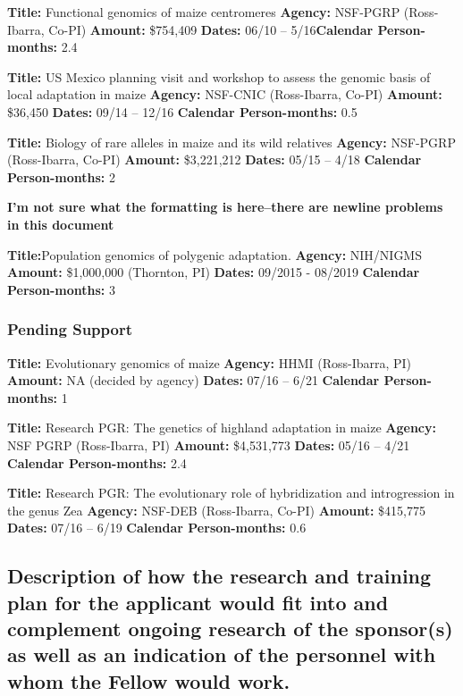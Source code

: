 \noindent\textbf{Title:} Functional genomics of maize centromeres 
\textbf{Agency:} NSF-PGRP (Ross-Ibarra, Co-PI)
\textbf{Amount:} \$754,409
\textbf{Dates:} 06/10 – 5/16\textbf{Calendar Person-months:} 2.4

\noindent\textbf{Title:} US Mexico planning visit and workshop to assess the genomic basis of local adaptation in maize 
\textbf{Agency:} NSF-CNIC (Ross-Ibarra, Co-PI)
\textbf{Amount:} \$36,450
\textbf{Dates:} 09/14 – 12/16
\textbf{Calendar Person-months:} 0.5

\textbf{Title:} Biology of rare alleles in maize and its wild relatives 
\textbf{Agency:} NSF-PGRP (Ross-Ibarra, Co-PI)
\textbf{Amount:} \$3,221,212
\textbf{Dates:} 05/15 – 4/18
\textbf{Calendar Person-months:} 2

\textbf{I'm not sure what the formatting is here--there are newline problems in this document}

\noindent\textbf{Title:}Population genomics of polygenic adaptation. 
\textbf{Agency:} NIH/NIGMS 
\textbf{Amount:} \$1,000,000 (Thornton, PI)
\textbf{Dates:} 09/2015 - 08/2019
\textbf{Calendar Person-months:} 3

\subsubsection*{Pending Support}

\noindent\textbf{Title:} Evolutionary genomics of maize 
\textbf{Agency:} HHMI (Ross-Ibarra, PI)
\textbf{Amount:} NA (decided by agency)
\textbf{Dates:} 07/16 – 6/21
\textbf{Calendar Person-months:} 1

\noindent\textbf{Title:} Research PGR: The genetics of highland adaptation in maize
\textbf{Agency:} NSF PGRP (Ross-Ibarra, PI)
\textbf{Amount:} \$4,531,773
\textbf{Dates:} 05/16 – 4/21
\textbf{Calendar Person-months:} 2.4

\noindent\textbf{Title:} Research PGR: The evolutionary role of hybridization and introgression in the genus Zea
\textbf{Agency:} NSF-DEB (Ross-Ibarra, Co-PI)
\textbf{Amount:} \$415,775
\textbf{Dates:} 07/16 – 6/19
\textbf{Calendar Person-months:} 0.6

\subsection{Description of how the research and training plan for the applicant would fit into and complement ongoing research of the sponsor(s) as well as an indication of the personnel with whom the Fellow would work.}

